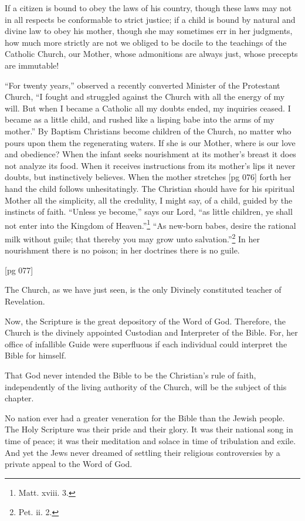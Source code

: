 If a citizen is bound to obey the laws of his
country, though these laws may not in all respects
be conformable to strict justice; if a child
is bound by natural and divine law to obey his
mother, though she may sometimes err in her
judgments, how much more strictly are not we
obliged to be docile to the teachings of the Catholic
Church, our Mother, whose admonitions are
always just, whose precepts are immutable!

“For twenty years,” observed a recently converted
Minister of the Protestant Church, “I
fought and struggled against the Church with
all the energy of my will. But when I became
a Catholic all my doubts ended, my inquiries
ceased. I became as a little child, and rushed
like a lisping babe into the arms of my mother.”
By Baptism Christians become children of the
Church, no matter who pours upon them the regenerating
waters. If she is our Mother, where
is our love and obedience? When the infant seeks
nourishment at its mother's breast it does not
analyze its food. When it receives instructions
from its mother's lips it never doubts, but instinctively
believes. When the mother stretches
[pg 076]
forth her hand the child follows unhesitatingly.
The Christian should have for his spiritual
Mother all the simplicity, all the credulity, I
might say, of a child, guided by the instincts of
faith. “Unless ye become,” says our Lord, “as
little children, ye shall not enter into the Kingdom
of Heaven.”\footnote{Matt. xviii. 3.}
“As new-born babes, desire
the rational milk without guile; that thereby you
may grow unto salvation.”\footnote{Pet. ii.
2.} In her nourishment
there is no poison; in her doctrines there is no
guile.

[pg 077]


The Church, as we have just seen, is the
only Divinely constituted teacher of Revelation.

Now, the Scripture is the great depository of
the Word of God. Therefore, the Church is the
divinely appointed Custodian and Interpreter of
the Bible. For, her office of infallible Guide were
superfluous if each individual could interpret the
Bible for himself.

That God never intended the Bible to be the
Christian's rule of faith, independently of the
living authority of the Church, will be the subject
of this chapter.

No nation ever had a greater veneration for
the Bible than the Jewish people. The Holy
Scripture was their pride and their glory. It
was their national song in time of peace; it was
their meditation and solace in time of tribulation
and exile. And yet the Jews never dreamed of
settling their religious controversies by a private
appeal to the Word of God.

